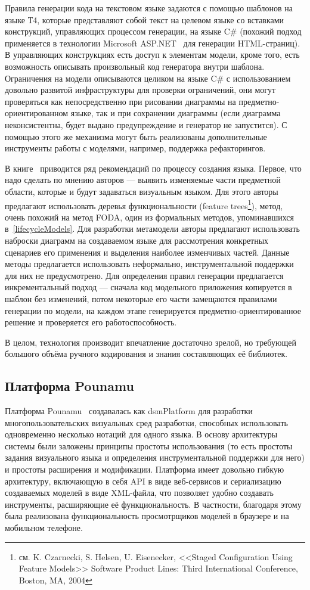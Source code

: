 Правила генерации кода на текстовом языке задаются с помощью шаблонов на языке Т4, которые
представляют собой текст на целевом языке со вставками конструкций, управляющих процессом 
генерации, на языке C\# (похожий подход применяется в технологии Microsoft ASP.NET~\cite{aspNet}
для генерации HTML-страниц). В управляющих конструкциях есть доступ к элементам модели, кроме того,
есть возможность описывать произвольный код генератора внутри шаблона. Ограничения на модели
описываются целиком на языке C\# с использованием довольно развитой инфраструктуры для
проверки ограничений, они могут проверяться как непосредственно при рисовании диаграммы
на предметно-ориентированном языке, так и при сохранении диаграммы (если диаграмма 
неконсистентна, будет выдано предупреждение и генератор не запустится). С помощью этого
же механизма могут быть реализованы дополнительные инструменты работы с моделями, например,
поддержка рефакторингов.

В книге~\cite{cook2007domain} приводится ряд рекомендаций по процессу создания языка.
Первое, что надо сделать по мнению авторов --- выявить изменяемые части предметной области,
которые и будут задаваться визуальным языком. Для этого авторы предлагают использовать
деревья функциональности (feature trees\footnote{см. K. Czarnecki, S. Helsen, U. Eisenecker, <<Staged Configuration
Using Feature Models>> Software Product Lines: Third International Conference, Boston, MA, 2004}),
метод, очень похожий на метод FODA, один из формальных методов, упоминавшихся в~\ref{lifecycleModels}.
Для разработки метамодели авторы предлагают использовать наброски диаграмм на создаваемом языке
для рассмотрения конкретных сценариев его применения и выделения наиболее изменчивых частей.
Данные методы предлагается использовать неформально, инструментальной поддержки для них не предусмотрено.
Для определения правил генерации предлагается инкрементальный подход --- сначала код модельного
приложения копируется в шаблон без изменений, потом некоторые его части замещаются правилами генерации
по модели, на каждом этапе генерируется предметно-ориентированное решение и проверяется
его работоспособность.

В целом, технология производит впечатление достаточно зрелой, но требующей большого
объёма ручного кодирования и знания составляющих её библиотек. 

\subsection{Платформа Pounamu}
Платформа Pounamu~\cite{zhu2007pounamu} создавалась как \ac{dsmPlatform} для разработки 
многопользовательских визуальных сред разработки, способных использовать одновременно 
несколько нотаций для одного языка. В основу архитектуры системы были заложены принципы 
простоты использования (то есть простоты задания визуального языка и определения инструментальной 
поддержки для него) и простоты расширения и модификации. Платформа имеет довольно 
гибкую архитектуру, включающую в себя \ac{API} в виде веб-сервисов и сериализацию создаваемых 
моделей в виде XML-файла, что позволяет удобно создавать инструменты, расширяющие её 
функциональность. В частности, благодаря этому была реализована функциональность просмотрщиков 
моделей в браузере и на мобильном телефоне.


